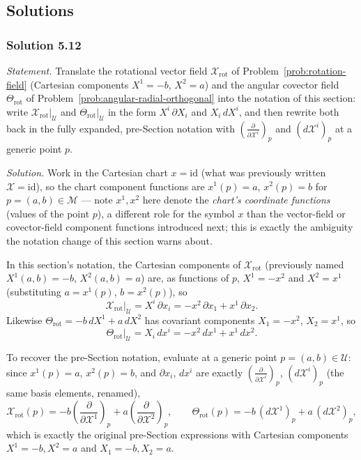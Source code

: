 \documentclass[11pt]{article}
\begin{document}
\subsection*{Solutions}

\subsubsection*{Solution 5.12}

\noindent\textit{Statement.} Translate the rotational vector field
$\mathcal X_{\mathrm{rot}}$ of Problem~\ref{prob:rotation-field}
(Cartesian components $X^1=-b$, $X^2=a$) and the angular covector field
$\Theta_{\mathrm{rot}}$ of Problem~\ref{prob:angular-radial-orthogonal}
into the notation of this section: write $\mathcal
X_{\mathrm{rot}}|_{\mathcal U}$ and $\Theta_{\mathrm{rot}}|_{\mathcal U}$
in the form $X^i\,\partial X_i$ and $X_i\,dX^i$, and then rewrite both back
in the fully expanded, pre-Section notation with
$\left(\frac{\partial}{\partial\mathcal X^i}\right)_p$ and $(d\mathcal
X^i)_p$ at a generic point $p$.

\medskip
\noindent\textit{Solution.} Work in the Cartesian chart $x=\mathrm{id}$
(what was previously written $\mathcal X=\mathrm{id}$), so the chart
component functions are $x^1(p)=a$, $x^2(p)=b$ for $p=(a,b)\in\mathcal M$
— note $x^1,x^2$ here denote the \emph{chart's coordinate functions}
(values of the point $p$), a different role for the symbol $x$ than the
vector-field or covector-field component functions introduced next; this
is exactly the ambiguity the notation change of this section warns about.

In this section's notation, the Cartesian components of $\mathcal
X_{\mathrm{rot}}$ (previously named $X^1(a,b)=-b$, $X^2(a,b)=a$) are, as
functions of $p$, $X^1=-x^2$ and $X^2=x^1$ (substituting $a=x^1(p)$,
$b=x^2(p)$), so
\[
\mathcal X_{\mathrm{rot}}|_{\mathcal U} = X^i\,\partial x_i = -x^2\,\partial x_1 + x^1\,\partial x_2.
\]
Likewise $\Theta_{\mathrm{rot}}=-b\,dX^1+a\,dX^2$ has covariant components
$X_1=-x^2$, $X_2=x^1$, so
\[
\Theta_{\mathrm{rot}}|_{\mathcal U} = X_i\,dx^i = -x^2\,dx^1 + x^1\,dx^2.
\]

To recover the pre-Section notation, evaluate at a generic point
$p=(a,b)\in\mathcal U$: since $x^1(p)=a$, $x^2(p)=b$, and $\partial x_i$,
$dx^i$ are exactly $\left(\frac{\partial}{\partial\mathcal
X^i}\right)_p$, $(d\mathcal X^i)_p$ (the same basis elements, renamed),
\[
\mathcal X_{\mathrm{rot}}(p) = -b\left(\frac{\partial}{\partial\mathcal X^1}\right)_p + a\left(\frac{\partial}{\partial\mathcal X^2}\right)_p,\qquad \Theta_{\mathrm{rot}}(p) = -b\,(d\mathcal X^1)_p + a\,(d\mathcal X^2)_p,
\]
which is exactly the original pre-Section expressions with Cartesian
components $X^1=-b,X^2=a$ and $X_1=-b,X_2=a$.
\end{document}
